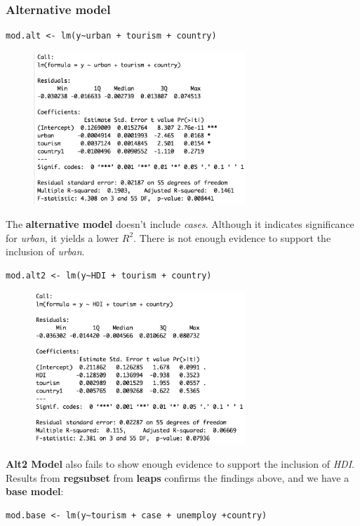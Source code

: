 \documentclass{article}
\begin{document}
\subsubsection*{Alternative model}
\begin{verbatim}
mod.alt <- lm(y~urban + tourism + country)
\end{verbatim}
\begin{figure}[H]
\centering
  \includegraphics[width=8cm]{summary-alt.png}
  \label{fig:summaryalt}
\end{figure}
The \textbf{alternative model} doesn't include \textit{cases}. Although it indicates significance for \textit{urban}, it yields a lower $R^2$. There is not enough evidence to support the inclusion of \textit{urban}. 
\begin{verbatim}
mod.alt2 <- lm(y~HDI + tourism + country)
\end{verbatim} 
\begin{figure}[H]
\centering
  \includegraphics[width=8cm]{summary-alt2.png}
  \label{fig:QQ}
\end{figure}
\textbf{Alt2 Model} also fails to show enough evidence to support the inclusion of \textit{HDI}. 
Results from \textbf{regsubset} from \textbf{leaps} confirms the findings above, and we have a \textbf{base model}:

\begin{verbatim}
mod.base <- lm(y~tourism + case + unemploy +country)
\end{verbatim}
\end{document}
